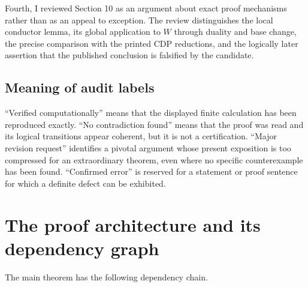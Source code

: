 \documentclass[
  10pt,
  letterpaper,
]{article}
\begin{document}
Fourth, I reviewed Section 10 as an argument about exact proof
mechanisms rather than as an appeal to exception. The review
distinguishes the local conductor lemma, its global application to \(W\)
through duality and base change, the precise comparison with the printed
CDP reductions, and the logically later assertion that the published
conclusion is falsified by the candidate.

\subsection{Meaning of audit labels}\label{meaning-of-audit-labels}

``Verified computationally'' means that the displayed finite calculation
has been reproduced exactly. ``No contradiction found'' means that the
proof was read and its logical transitions appear coherent, but it is
not a certification. ``Major revision request'' identifies a pivotal
argument whose present exposition is too compressed for an extraordinary
theorem, even where no specific counterexample has been found.
``Confirmed error'' is reserved for a statement or proof sentence for
which a definite defect can be exhibited.

\section{The proof architecture and its dependency
graph}\label{the-proof-architecture-and-its-dependency-graph}

The main theorem has the following dependency chain.
\end{document}
